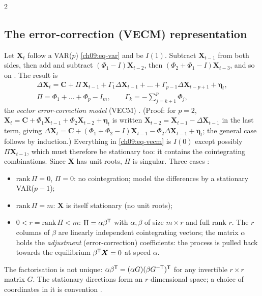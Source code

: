 \begin{paracol}{2}
\subsection{The error-correction (VECM) representation}\label{ch09:sec-vecm}
Let $\bm X_t$ follow a VAR($p$) \eqref{ch09:eq-var} and be $I(1)$. Subtract $\bm X_{t-1}$ from both sides, then add and subtract
$(\Phi_1-I)\bm X_{t-2}$, then $(\Phi_2+\Phi_1-I)\bm X_{t-3}$, and so on . The result is
\begin{equation}\label{ch09:eq-vecm}
  \begin{gathered}
  \Delta\bm X_t=\bm C+\Pi\,\bm X_{t-1}+\Gamma_1\Delta\bm X_{t-1}+\dots+\Gamma_{p-1}\Delta\bm X_{t-p+1}+\bm\eta_t,\\
  \Pi=\Phi_1+\dots+\Phi_p-I_m,\qquad \Gamma_k=-\sum_{j=k+1}^p\Phi_j,
  \end{gathered}
\end{equation}
the \emph{vector error-correction model} (VECM) . (Proof: for $p=2$, $\bm X_t=\bm C+\Phi_1\bm X_{t-1}+\Phi_2\bm X_{t-2}+\bm\eta_t$ is written
$\bm X_{t-2}=\bm X_{t-1}-\Delta\bm X_{t-1}$ in the last term, giving $\Delta\bm X_t=\bm C+(\Phi_1+\Phi_2-I)\bm X_{t-1}-\Phi_2\Delta\bm X_{t-1}+\bm\eta_t$; the general case
follows by induction.) Everything in \eqref{ch09:eq-vecm} is $I(0)$ except possibly $\Pi\bm X_{t-1}$, which must therefore be stationary too: it contains the
cointegrating combinations. Since $\bm X$ has unit roots, $\Pi$ is singular. Three cases :
\begin{itemize}
  \item $\mathrm{rank}\,\Pi=0$, $\Pi=0$: no cointegration; model the differences by a stationary VAR($p-1$);
  \item $\mathrm{rank}\,\Pi=m$: $\bm X$ is itself stationary (no unit roots);
  \item $0<r=\mathrm{rank}\,\Pi<m$: $\Pi=\alpha\beta^{\mathsf T}$ with $\alpha,\beta$ of size $m\times r$ and full rank $r$. The $r$ columns of $\beta$ are linearly independent
        cointegrating vectors; the matrix $\alpha$ holds the \emph{adjustment} (error-correction) coefficients: the process is pulled back towards the equilibrium
        $\beta^{\mathsf T}\bm X=0$ at speed $\alpha$.
\end{itemize}
The factorisation is not unique: $\alpha\beta^{\mathsf T}=(\alpha G)(\beta G^{-\mathsf T})^{\mathsf T}$ for any invertible $r\times r$ matrix $G$. The stationary
directions form an $r$-dimensional space; a choice of coordinates in it is convention .


\end{paracol}
